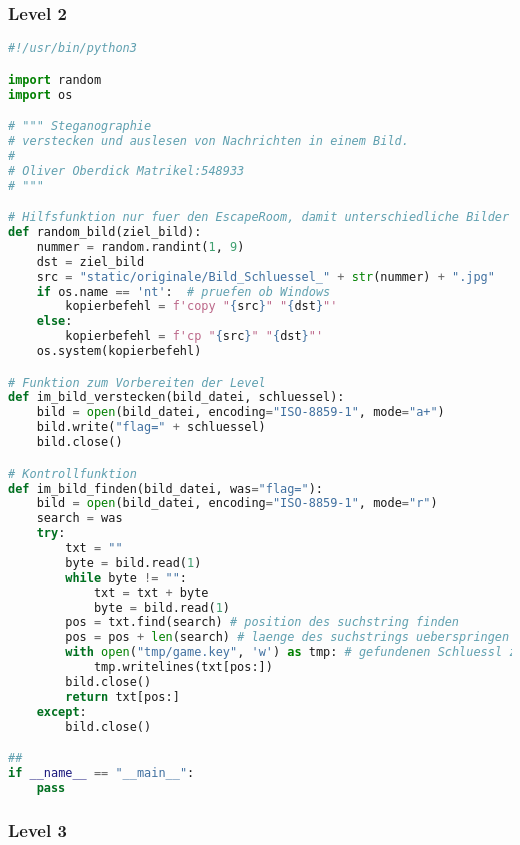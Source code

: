 \documentclass[a4paper 11pt]{article}
\begin{document}
\subsubsection{Level 2}
\begin{lstlisting}[language=python, caption=Funktionalitäten für Level 2]
#!/usr/bin/python3

import random
import os

# """ Steganographie
# verstecken und auslesen von Nachrichten in einem Bild.
#
# Oliver Oberdick Matrikel:548933
# """

# Hilfsfunktion nur fuer den EscapeRoom, damit unterschiedliche Bilder genutzt werden
def random_bild(ziel_bild):
	nummer = random.randint(1, 9)
	dst = ziel_bild
	src = "static/originale/Bild_Schluessel_" + str(nummer) + ".jpg"
	if os.name == 'nt':  # pruefen ob Windows
		kopierbefehl = f'copy "{src}" "{dst}"'
	else:
		kopierbefehl = f'cp "{src}" "{dst}"'
	os.system(kopierbefehl)

# Funktion zum Vorbereiten der Level
def im_bild_verstecken(bild_datei, schluessel):
    bild = open(bild_datei, encoding="ISO-8859-1", mode="a+")
    bild.write("flag=" + schluessel)
    bild.close()

# Kontrollfunktion
def im_bild_finden(bild_datei, was="flag="):
    bild = open(bild_datei, encoding="ISO-8859-1", mode="r")
    search = was
    try:
        txt = ""
        byte = bild.read(1)
        while byte != "":
            txt = txt + byte
            byte = bild.read(1)
        pos = txt.find(search) # position des suchstring finden
        pos = pos + len(search) # laenge des suchstrings ueberspringen
        with open("tmp/game.key", 'w') as tmp: # gefundenen Schluessl zwischenspeichern
            tmp.writelines(txt[pos:])
        bild.close()
        return txt[pos:]
    except:
        bild.close()

##
if __name__ == "__main__":
    pass

\end{lstlisting}
\flushleft

\subsubsection{Level 3}
\end{document}
